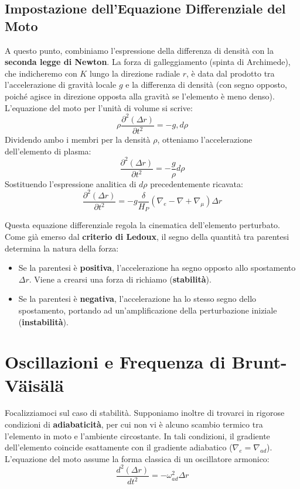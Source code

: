 \subsection{Impostazione dell'Equazione Differenziale del Moto}

A questo punto, combiniamo l'espressione della differenza di densità con la \textbf{seconda legge di Newton}. La forza di galleggiamento (spinta di Archimede), che indicheremo con $K$ lungo la direzione radiale $r$, è data dal prodotto tra l'accelerazione di gravità locale $g$ e la differenza di densità (con segno opposto, poiché agisce in direzione opposta alla gravità se l'elemento è meno denso). L'equazione del moto per l'unità di volume si scrive:
\begin{equation}
\rho \frac{\partial^2 (\Delta r)}{\partial t^2} = - g , d\rho
\end{equation}
Dividendo ambo i membri per la densità $\rho$, otteniamo l'accelerazione dell'elemento di plasma:
\begin{equation}
\frac{\partial^2 (\Delta r)}{\partial t^2} = - \frac{g}{\rho} d\rho
\end{equation}
Sostituendo l'espressione analitica di $d\rho$ precedentemente ricavata:
\begin{equation}
\frac{\partial^2 (\Delta r)}{\partial t^2} = - g \frac{\delta}{H_P} \left( \nabla_e - \nabla + \nabla_\mu \right) \Delta r
\end{equation}

Questa equazione differenziale regola la cinematica dell'elemento perturbato. Come già emerso dal \textbf{criterio di Ledoux}, il segno della quantità tra parentesi determina la natura della forza:
\begin{itemize}
\item Se la parentesi è \textbf{positiva}, l'accelerazione ha segno opposto allo spostamento $\Delta r$. Viene a crearsi una forza di richiamo (\textbf{stabilità}).
\item Se la parentesi è \textbf{negativa}, l'accelerazione ha lo stesso segno dello spostamento, portando ad un'amplificazione della perturbazione iniziale (\textbf{instabilità}).
\end{itemize}

\section{Oscillazioni e Frequenza di Brunt-Väisälä}

Focalizziamoci sul caso di stabilità.
Supponiamo inoltre di trovarci in rigorose condizioni di \textbf{adiabaticità}, per cui non vi è alcuno scambio termico tra l'elemento in moto e l'ambiente circostante. In tali condizioni, il gradiente dell'elemento coincide esattamente con il gradiente adiabatico ($\nabla_e = \nabla_{ad}$). L'equazione del moto assume la forma classica di un oscillatore armonico:
\begin{equation}
\frac{d^2 (\Delta r)}{dt^2} = - \omega_{ad}^2 \Delta r
\end{equation}

